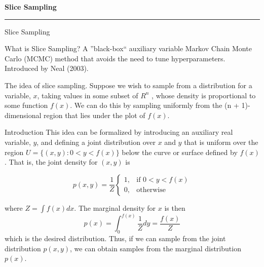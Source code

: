 
% 

\begin{frame}
	\vspace{2cm}
	\begin{center}
		{\Huge\textbf{\textcolor{copenhagenred}{Slice Sampling}}}
		\vspace{2cm}
		\vspace{1cm}

		\rule{4cm}{3pt}
	\end{center}
\end{frame}

\begin{frame}{Slice Sampling}
	\begin{block}{What is Slice Sampling?}
		A ''black-box`` auxiliary variable Markov Chain Monte Carlo (MCMC) method that
		avoids the need to tune hyperparameters. Introduced by Neal (2003).
	\end{block}

	The idea of slice sampling. Suppose we wish to sample from a distribution for a
	variable, $x$, taking values in some subset of $R^n$ , whose density is proportional
	to some function $f (x)$. We can do this by sampling uniformly from the
	(n + 1)-dimensional region that lies under the plot of $f (x)$.
\end{frame}

\begin{frame}{Introduction}
	This idea can be
	formalized by introducing an auxiliary real variable, $y$, and deﬁning a joint
	distribution over $x$ and $y$ that is uniform over the region
	$U = \{ (x,y):0 < y < f (x) \}$ below the curve or surface deﬁned
	by $f (x)$. That is, the joint density for $(x,y)$ is

	\begin{equation*}
		p(x,y) = \frac{1}{Z} \begin{cases}
			1, & \text{if } 0 < y < f(x) \\
			0, & \text{otherwise}
		\end{cases}
	\end{equation*}

	where $Z = \int f(x)dx$. The marginal density for $x$ is then
	\begin{equation*}
		p(x) = \int_0^{f(x)} \frac{1}{Z} dy = \frac{f(x)}{Z}
	\end{equation*}
	which is the desired distribution. Thus, if we can sample from the joint
	distribution $p(x,y)$, we can obtain samples from the marginal distribution $p(x)$.
\end{frame}

